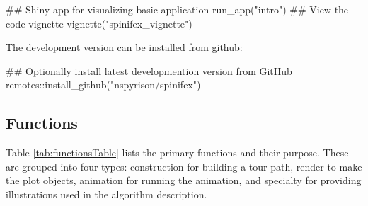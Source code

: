 \begin{Schunk}
\begin{Sinput}
## Shiny app for visualizing basic application
run_app("intro")
## View the code vignette
vignette("spinifex_vignette")
\end{Sinput}
\end{Schunk}

\noindent The development version can be installed from github:

\begin{Schunk}
\begin{Sinput}
## Optionally install latest developmention version from GitHub
remotes::install_github("nspyrison/spinifex")
\end{Sinput}
\end{Schunk}

\hypertarget{functions}{%
\subsection{Functions}\label{functions}}

Table \ref{tab:functionsTable} lists the primary functions and their
purpose. These are grouped into four types: construction for building a
tour path, render to make the plot objects, animation for running the
animation, and specialty for providing illustrations used in the
algorithm description.

